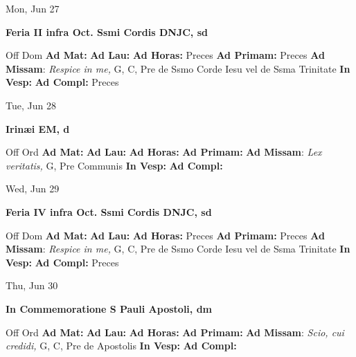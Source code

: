 \documentclass[10pt]{article}
\begin{document}
\begin{minipage}{3.5in}
\vspace{2em}\begin{center}
Mon, Jun 27
\end{center}\textbf{ \large Feria II infra Oct. Ssmi Cordis DNJC, \textnormal{\normalsize sd}}
\begin{justify}
Off Dom
\textbf{Ad Mat: }
\textbf{Ad Lau: }
\textbf{Ad Horas: }Preces
\textbf{Ad Primam: }Preces
\textbf{Ad Missam}: \textit{Respice in me,} G, C, Pre de Ssmo Corde Iesu vel de Ssma Trinitate
\textbf{In Vesp: }
\textbf{Ad Compl: }Preces\end{justify}
\end{minipage}



\begin{minipage}{3.5in}
\vspace{2em}\begin{center}
Tue, Jun 28
\end{center}\textbf{ \large Irinæi EM, \textnormal{\normalsize d}}
\begin{justify}
Off Ord
\textbf{Ad Mat: }
\textbf{Ad Lau: }
\textbf{Ad Horas: }
\textbf{Ad Primam: }
\textbf{Ad Missam}: \textit{Lex veritatis,} G, Pre Communis
\textbf{In Vesp: }
\textbf{Ad Compl: }\end{justify}
\end{minipage}



\begin{minipage}{3.5in}
\vspace{2em}\begin{center}
Wed, Jun 29
\end{center}\textbf{ \large Feria IV infra Oct. Ssmi Cordis DNJC, \textnormal{\normalsize sd}}
\begin{justify}
Off Dom
\textbf{Ad Mat: }
\textbf{Ad Lau: }
\textbf{Ad Horas: }Preces
\textbf{Ad Primam: }Preces
\textbf{Ad Missam}: \textit{Respice in me,} G, C, Pre de Ssmo Corde Iesu vel de Ssma Trinitate
\textbf{In Vesp: }
\textbf{Ad Compl: }Preces\end{justify}
\end{minipage}



\begin{minipage}{3.5in}
\vspace{2em}\begin{center}
Thu, Jun 30
\end{center}\textbf{ \large In Commemoratione S Pauli Apostoli, \textnormal{\normalsize dm}}
\begin{justify}
Off Ord
\textbf{Ad Mat: }
\textbf{Ad Lau: }
\textbf{Ad Horas: }
\textbf{Ad Primam: }
\textbf{Ad Missam}: \textit{Scio, cui credidi,} G, C, Pre de Apostolis
\textbf{In Vesp: }
\textbf{Ad Compl: }\end{justify}
\end{minipage}
\end{document}
